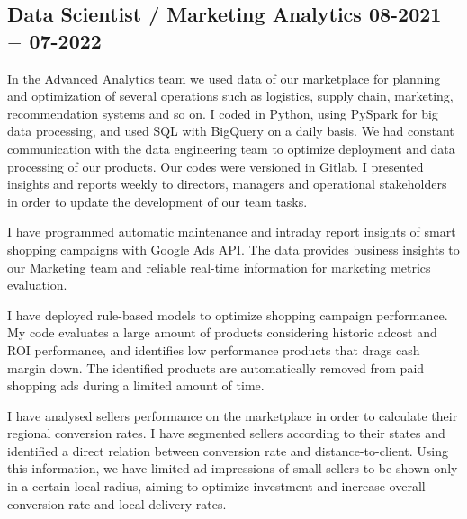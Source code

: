 \subsection{{Data Scientist / Marketing Analytics \hfill 08-2021 $-$ 07-2022}}
\begin{zitemize}
\item  In the Advanced Analytics team we used data of our marketplace for planning and optimization of several operations such
as logistics, supply chain, marketing, recommendation systems and so on. I coded in Python, using PySpark for big data processing, 
and used SQL with BigQuery on a daily basis. We had constant communication with the data engineering team to optimize deployment and data processing of our products. 
Our codes were versioned in Gitlab. I presented insights and reports weekly to directors, managers and operational stakeholders in order to update the development of our team tasks.
\item I have programmed automatic maintenance and intraday report insights of smart shopping campaigns with Google Ads API. The data provides business insights to our Marketing team 
and reliable real-time information for marketing metrics evaluation.
\item I have deployed rule-based models to optimize shopping campaign performance. My code evaluates a large amount of products considering historic adcost and ROI performance, 
and identifies low performance products that drags cash margin down. The identified products are automatically removed from paid shopping ads during a limited amount of time.
\item I have analysed sellers performance on the marketplace in order to calculate their regional conversion rates. I have segmented sellers according to their states and identified 
a direct relation between conversion rate and distance-to-client. Using this information, we have limited ad impressions of small sellers to be shown only in a certain local radius, 
aiming to optimize investment and increase overall conversion rate and local delivery rates.
\end{zitemize}
